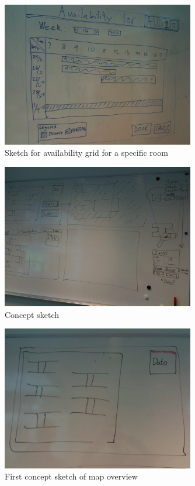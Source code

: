 \begin{figure}
\begin{center}
\leavevmode
\includegraphics[width=0.75\textwidth]{images/whiteboard3}
\end{center}
\caption{Sketch for availability grid for a specific room}
\label{fig:app_w3}
\end{figure}

\begin{figure}
\begin{center}
\leavevmode
\includegraphics[width=0.75\textwidth]{images/whiteboard4}
\end{center}
\caption{Concept sketch}
\label{fig:app_w4}
\end{figure}

\begin{figure}
\begin{center}
\leavevmode
\includegraphics[width=0.75\textwidth]{images/whiteboard5}
\end{center}
\caption{First concept sketch of map overview}
\label{fig:app_w5}
\end{figure}


